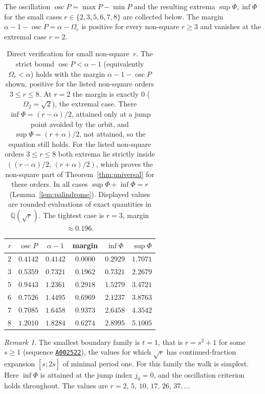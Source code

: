 \documentclass{birkjour}
\theoremstyle{definition}
\theoremstyle{remark}
\newtheorem{remark}[theorem]{Remark}
\begin{document}
The oscillation $\operatorname{osc}P=\max P-\min P$ and the
resulting extrema $\sup\Phi,\inf\Phi$ for the small cases
$r\in\{2,3,5,6,7,8\}$ are collected below. The margin
$\alpha-1-\operatorname{osc}P=\alpha-\Omega_{r}$ is positive
for every non-square $r\ge 3$ and vanishes at the extremal
case $r=2$.

\begin{table}[htbp]
\centering
\small
\begin{tabular}{r|ccc|cc}
\hline
$r$ & $\operatorname{osc}P$ & $\alpha-1$ & margin
  & $\inf\Phi$ & $\sup\Phi$ \\
\hline
$2$ & $0.4142$ & $0.4142$ & $0.0000$ & $0.2929$ & $1.7071$ \\
$3$ & $0.5359$ & $0.7321$ & $0.1962$ & $0.7321$ & $2.2679$ \\
$5$ & $0.9443$ & $1.2361$ & $0.2918$ & $1.5279$ & $3.4721$ \\
$6$ & $0.7526$ & $1.4495$ & $0.6969$ & $2.1237$ & $3.8763$ \\
$7$ & $0.7085$ & $1.6458$ & $0.9373$ & $2.6458$ & $4.3542$ \\
$8$ & $1.2010$ & $1.8284$ & $0.6274$ & $2.8995$ & $5.1005$ \\
\hline
\end{tabular}
\caption{Direct verification for small non-square~$r$. The
strict bound $\operatorname{osc}P<\alpha-1$
(equivalently $\Omega_{r}<\alpha$) holds with the margin
$\alpha-1-\operatorname{osc}P$ shown, positive for the listed
non-square orders $3\le r\le 8$. At $r=2$ the margin is
exactly $0$ ($\Omega_{2}=\sqrt2$), the extremal case. There
$\inf\Phi=(r-\alpha)/2$, attained only at a jump point avoided
by the orbit, and $\sup\Phi=(r+\alpha)/2$, not attained, so the
equation still holds. For the listed non-square orders
$3\le r\le 8$ both extrema lie strictly inside
$((r-\alpha)/2,\,(r+\alpha)/2)$, which proves the non-square
part of Theorem~\ref{thm:universal} for these orders. In all
cases $\sup\Phi+\inf\Phi=r$ (Lemma~\ref{lem:palindrome}). Displayed
values are rounded evaluations of exact quantities in
$\mathbb{Q}(\sqrt{r})$. The tightest case is $r=3$, margin
$\approx 0.196$.}
\label{tab:verification}
\end{table}

\begin{remark}\label{rem:t_one}
The smallest boundary family is $t=1$, that is $r=s^{2}+1$
for some $s\ge 1$ (sequence
\href{https://oeis.org/A002522}{\texttt{A002522}}), the
values for which $\sqrt{r}$ has continued-fraction expansion
$[s;\overline{2s}]$ of minimal period one. For this family
the walk is simplest. Here $\inf\Phi$ is attained at the jump
index $j_{0}=0$, and the oscillation criterion holds
throughout. The values are $r=2,\,5,\,10,\,17,\,26,\,37,
\ldots$
\end{remark}
\end{document}
